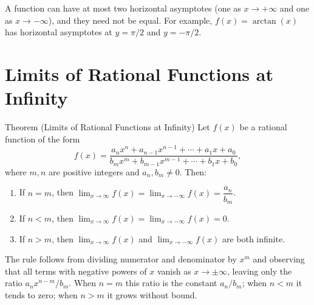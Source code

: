 \begin{remark*}
A function can have at most two horizontal asymptotes (one as
$x \to +\infty$ and one as $x \to -\infty$), and they need not
be equal.
For example, $f(x) = \arctan(x)$ has horizontal asymptotes at
$y = \pi/2$ and $y = -\pi/2$.
\end{remark*}

\section*{Limits of Rational Functions at Infinity}

\begin{theorembox}{Theorem (Limits of Rational Functions at Infinity)}
Let $f(x)$ be a rational function of the form
\[
  f(x) = \frac{a_n x^n + a_{n-1} x^{n-1} + \cdots + a_1 x + a_0}
              {b_m x^m + b_{m-1} x^{m-1} + \cdots + b_1 x + b_0},
\]
where $m, n$ are positive integers and $a_n, b_m \neq 0$. Then:
\begin{enumerate}
  \item If $n = m$, then
        $\displaystyle\lim_{x \to \infty} f(x)
         = \lim_{x \to -\infty} f(x) = \dfrac{a_n}{b_m}$.

  \item If $n < m$, then
        $\displaystyle\lim_{x \to \infty} f(x)
         = \lim_{x \to -\infty} f(x) = 0$.

  \item If $n > m$, then $\lim_{x \to \infty} f(x)$ and
        $\lim_{x \to -\infty} f(x)$ are both infinite.
\end{enumerate}
\end{theorembox}

\begin{remark*}
The rule follows from dividing numerator and denominator by $x^m$
and observing that all terms with negative powers of $x$ vanish
as $x \to \pm\infty$, leaving only the ratio $a_n x^{n-m} / b_m$.
When $n = m$ this ratio is the constant $a_n/b_m$; when $n < m$
it tends to zero; when $n > m$ it grows without bound.
\end{remark*}